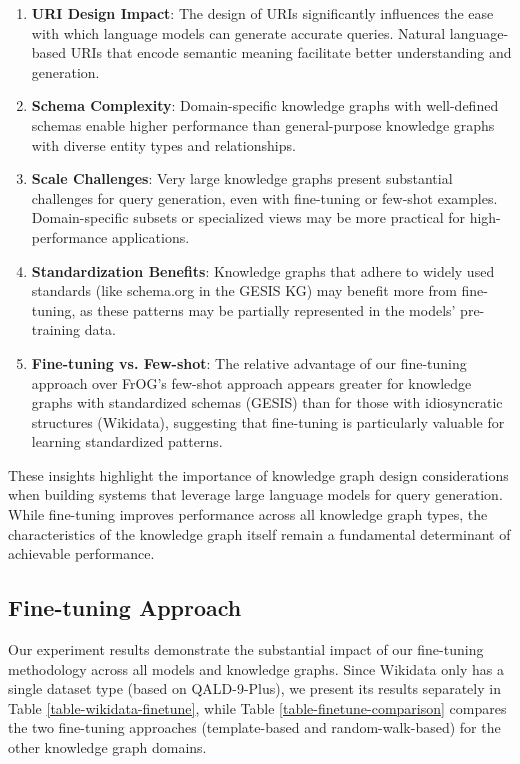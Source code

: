 \begin{enumerate}
    \item \textbf{URI Design Impact}: The design of URIs significantly influences the ease with which language models can generate accurate queries. Natural language-based URIs that encode semantic meaning facilitate better understanding and generation.
    
    \item \textbf{Schema Complexity}: Domain-specific knowledge graphs with well-defined schemas enable higher performance than general-purpose knowledge graphs with diverse entity types and relationships.
    
    \item \textbf{Scale Challenges}: Very large knowledge graphs present substantial challenges for query generation, even with fine-tuning or few-shot examples. Domain-specific subsets or specialized views may be more practical for high-performance applications.
    
    \item \textbf{Standardization Benefits}: Knowledge graphs that adhere to widely used standards (like schema.org in the GESIS KG) may benefit more from fine-tuning, as these patterns may be partially represented in the models' pre-training data.
    
    \item \textbf{Fine-tuning vs. Few-shot}: The relative advantage of our fine-tuning approach over FrOG's few-shot approach appears greater for knowledge graphs with standardized schemas (GESIS) than for those with idiosyncratic structures (Wikidata), suggesting that fine-tuning is particularly valuable for learning standardized patterns.
\end{enumerate}

These insights highlight the importance of knowledge graph design considerations when building systems that leverage large language models for query generation. While fine-tuning improves performance across all knowledge graph types, the characteristics of the knowledge graph itself remain a fundamental determinant of achievable performance.

\subsection{Fine-tuning Approach}
\label{ga-finetune}

Our experiment results demonstrate the substantial impact of our fine-tuning methodology across all models and knowledge graphs. Since Wikidata only has a single dataset type (based on QALD-9-Plus), we present its results separately in Table \ref{table-wikidata-finetune}, while Table \ref{table-finetune-comparison} compares the two fine-tuning approaches (template-based and random-walk-based) for the other knowledge graph domains.

